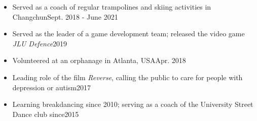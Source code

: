 \documentclass[a4paper,12pt]{article}
\begin{document}
\begin{itemize}[leftmargin=0cm]
\setlength{\itemsep}{-5pt}
\item[] Served as a coach of regular trampolines and skiing activities in Changchun\hfill Sept. 2018 - June 2021
\item[] Served as the leader of a game development team; released the video game \textit{JLU Defence}\hfill 2019
\item[] Volunteered at an orphanage in Atlanta, USA\hfill Apr. 2018
\item[] {Leading role} of the film \textit{Reverse}, calling the public to care for people with depression or autism\hfill 2017
\item[] Learning {breakdancing} since 2010; serving as a coach of the University {Street Dance} club since\hfill 2015
\end{itemize}




\end{document}
